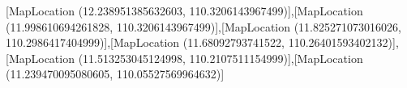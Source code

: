 [MapLocation (12.238951385632603, 110.3206143967499)],[MapLocation (11.998610694261828, 110.3206143967499)],[MapLocation (11.825271073016026, 110.2986417404999)],[MapLocation (11.68092793741522, 110.26401593402132)],[MapLocation (11.513253045124998, 110.2107511154999)],[MapLocation (11.239470095080605, 110.05527569964632)]